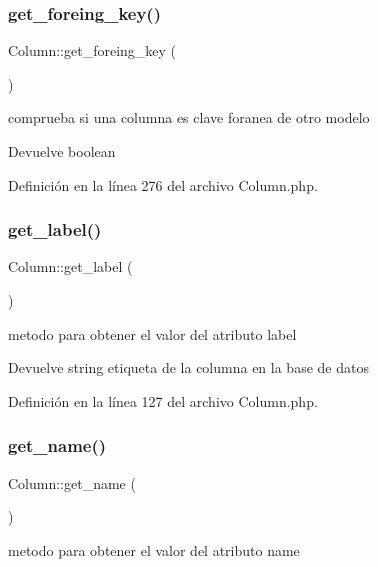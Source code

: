 \subsubsection{\texorpdfstring{get\_foreing\_key()}{get\_foreing\_key()}}
{\footnotesize\ttfamily Column\+::get\+\_\+foreing\+\_\+key (\begin{DoxyParamCaption}{ }\end{DoxyParamCaption})}

comprueba si una columna es clave foranea de otro modelo

\begin{DoxyReturn}{Devuelve}
boolean 
\end{DoxyReturn}


Definición en la línea 276 del archivo Column.\+php.

\mbox{\label{class_column_a119d1743c608b0872a5df560b084ae36}} 
\subsubsection{\texorpdfstring{get\_label()}{get\_label()}}
{\footnotesize\ttfamily Column\+::get\+\_\+label (\begin{DoxyParamCaption}{ }\end{DoxyParamCaption})}

metodo para obtener el valor del atributo label

\begin{DoxyReturn}{Devuelve}
string etiqueta de la columna en la base de datos 
\end{DoxyReturn}


Definición en la línea 127 del archivo Column.\+php.

\mbox{\label{class_column_adb3148efdbf2d710ae3d6617ce16781c}} 
\subsubsection{\texorpdfstring{get\_name()}{get\_name()}}
{\footnotesize\ttfamily Column\+::get\+\_\+name (\begin{DoxyParamCaption}{ }\end{DoxyParamCaption})}

metodo para obtener el valor del atributo name

